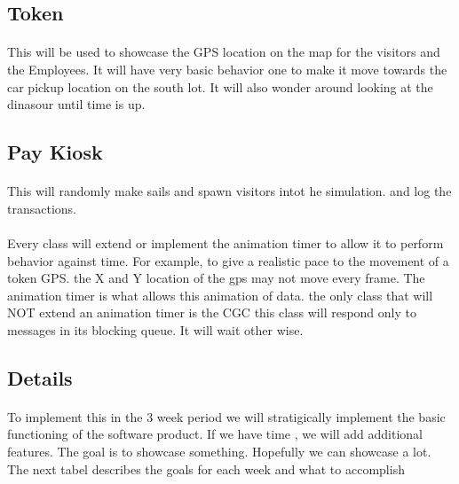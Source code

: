 \documentclass[12pt]{article}
\begin{document}
\subsection{Token}
\paragraph{} This will be used to showcase the GPS location on the map for the visitors and the Employees. It will have very basic behavior one 
to make it move towards the car pickup location on the south lot. It will also wonder around looking at the dinasour until time is up.

\subsection{Pay Kiosk}
\paragraph{} This will randomly make sails and spawn visitors intot he simulation. and log the transactions.

\paragraph{}Every class will extend or implement the animation timer to allow it to perform behavior against time. For example, 
to give a realistic pace to the movement of a token GPS. the X and Y location of the gps may not move every frame. The animation timer is what allows this animation of data.
the only class that will NOT extend an animation timer is the CGC this class will respond only to messages in its blocking queue. It will wait other wise.

\subsection{Details}
\paragraph{}To implement this in the 3 week period we will stratigically implement the basic functioning of the software product. If we have time 
, we will add additional features. The goal is to showcase something. Hopefully we can showcase a lot. The next tabel describes the goals for each week and what to accomplish 
\end{document}
